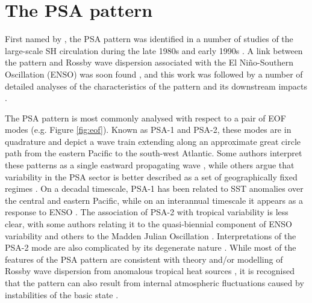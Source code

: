 
\section{The PSA pattern}\label{s:psa_overview}

First named by \citet{Mo1987}, the PSA pattern was identified in a number of studies of the large-scale SH circulation during the late 1980s and early 1990s \citep[e.g.][]{Kidson1988,Ghil1991,Lau1994}. A link between the pattern and Rossby wave dispersion associated with the El Ni\~{n}o-Southern Oscillation (ENSO) was soon found \citep[e.g.][]{Karoly1989}, and this work was followed by a number of detailed analyses of the characteristics of the pattern and its downstream impacts \citep[e.g.][]{Mo1998,Mo2000,Mo2001}.

The PSA pattern is most commonly analysed with respect to a pair of EOF modes (e.g. Figure \ref{fig:eof}). Known as PSA-1 and PSA-2, these modes are in quadrature and depict a wave train extending along an approximate great circle path from the eastern Pacific to the south-west Atlantic. Some authors interpret these patterns as a single eastward propagating wave \citep{Mo1998}, while others argue that variability in the PSA sector is better described as a set of geographically fixed regimes \citep{Robertson2003}. On a decadal timescale, PSA-1 has been related to SST anomalies over the central and eastern Pacific, while on an interannual timescale it appears as a response to ENSO \citep{Mo2001}. The association of PSA-2 with tropical variability is less clear, with some authors relating it to the quasi-biennial component of ENSO variability \citep{Mo2000} and others to the Madden Julian Oscillation \citep{Renwick1999}. Interpretations of the PSA-2 mode are also complicated by its degenerate \citep{North1982} nature \citep[e.g. Figure 1;][]{Mo2000}. While most of the features of the PSA pattern are consistent with theory and/or modelling of Rossby wave dispersion from anomalous tropical heat sources \citep[e.g.][]{Liu2007,Li2015}, it is recognised that the pattern can also result from internal atmospheric fluctuations caused by instabilities of the basic state \citep[and that both mechanisms likely act in concert; e.g.][]{Grimm2009}.

